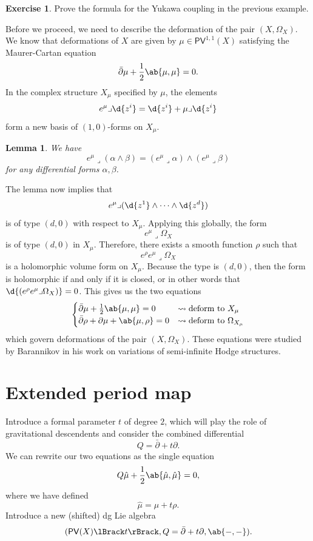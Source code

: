\documentclass[article,10pt,oneside,oldfontcommands]{memoir}
\newtheorem{lem}[thm]{Lemma}
\theoremstyle{definition}
\newtheorem{exer}[thm]{Exercise}
\theoremstyle{remark}
\theoremstyle{plain}
\theoremstyle{definition}
\theoremstyle{remark}
\newcommand{\ms}[1]{\mathsf{#1}}
\newcommand{\1}{\mathbf{1}}
\newcommand{\2}{\mathbf{2}}
\newcommand{\3}{\mathbf{3}}
\newcommand{\ps}[1]{\lBrack #1 \rBrack}
\newcommand{\dbar}{\bar{\partial}}
\begin{document}
\begin{exer}
    Prove the formula for the Yukawa coupling in the previous example.
\end{exer}

Before we proceed, we need to describe the deformation of the pair \((X, \Omega_X)\). We know that deformations of \(X\) are given by \(\mu \in \ms{PV}^{1,1}(X)\) satisfying the Maurer-Cartan equation
\[ \dbar \mu + \frac{1}{2} \ab\{\mu, \mu\}  = 0. \]
In the complex structure \(X_{\mu}\) specified by \(\mu\), the elements
\[ e^{\mu} \lrcorner \d{z^i} = \d{z^i} + \mu \lrcorner \d{z^i} \]
form a new basis of \((1,0)\)-forms on \(X_{\mu}\).

\begin{lem}
    We have
    \[ e^{\mu} \lrcorner (\alpha \wedge \beta) = (e^{\mu} \lrcorner \alpha) \wedge (e^{\mu} \lrcorner \beta) \]
    for any differential forms \(\alpha, \beta\).
\end{lem}

The lemma now implies that 
\[ e^{\mu} \lrcorner (\d{z^1} \wedge \cdots \wedge \d{z^d}) \]
is of type \((d, 0)\) with respect to \(X_{\mu}\). Applying this globally, the form
\[ e^{\mu} \lrcorner \Omega_X \]
is of type \((d, 0)\) in \(X_{\mu}\). Therefore, there exists a smooth function \(\rho\) such that
\[ e^{\rho} e^{\mu} \lrcorner \Omega_X \]
is a holomorphic volume form on \(X_{\mu}\). Because the type is \((d, 0)\), then the form is holomorphic if and only if it is closed, or in other words that \(\d{(e^{\rho} e^{\mu} \lrcorner \Omega_X)} = 0\). This gives us the two equations
\[ \begin{cases}
    \dbar \mu + \frac{1}{2} \ab\{\mu, \mu\} = 0 & \rightsquigarrow \text{deform to } X_{\mu}\\
    \dbar \rho + \partial \mu + \ab\{ \mu, \rho \} = 0 & \rightsquigarrow \text{deform to } \Omega_{X_{\mu}}
\end{cases} \]
which govern deformations of the pair \((X, \Omega_X)\). These equations were studied by Barannikov in his work on variations of semi-infinite Hodge structures.

\chapter{Extended period map}%
\label{cha:Extended period map}

Introduce a formal parameter \(t\) of degree \(2\), which will play the role of gravitational descendents and consider the combined differential
\[ Q = \dbar + t \partial. \]
We can rewrite our two equations as the single equation
\[ Q \hat{\mu} + \frac{1}{2} \ab\{\hat{\mu}, \hat{\mu}\} = 0, \]
where we have defined
\[ \hat{\mu} = \mu + t \rho. \]
Introduce a new (shifted) dg Lie algebra
\[ (\ms{PV}(X)\ps{t}, Q = \dbar + t \partial, \ab\{-,-\}). \]
\end{document}
